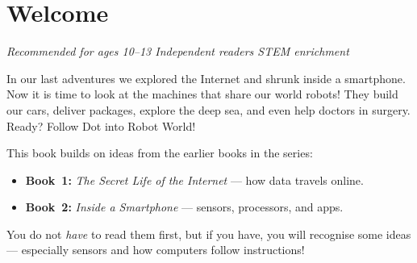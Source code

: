 \documentclass[11pt,openany]{book}
\begin{document}
\section*{Welcome}

\begin{center}
  \small\itshape
  Recommended for ages 10--13 \textbar{} Independent readers \textbar{} STEM enrichment
\end{center}

In our last adventures we explored the Internet and shrunk inside a smartphone.
Now it is time to look at the machines that share our world \textemdash{} robots!
They build our cars, deliver packages, explore the deep sea, and even help
doctors in surgery. Ready? Follow Dot into Robot World!

\begin{tcolorbox}[enhanced,colback=SunYellow!12,colframe=SunYellow!70!black,arc=6pt,boxrule=1pt,
  fonttitle=\bfseries, title={Before You Begin}]
  This book builds on ideas from the earlier books in the series:
  \begin{itemize}
    \item \textbf{Book~1:} \emph{The Secret Life of the Internet} --- how data travels online.
    \item \textbf{Book~2:} \emph{Inside a Smartphone} --- sensors, processors, and apps.
  \end{itemize}
  You do not \emph{have} to read them first, but if you have, you will recognise some ideas --- especially sensors and how computers follow instructions!
\end{tcolorbox}

\tableofcontents

\mainmatter











\backmatter
\end{document}
